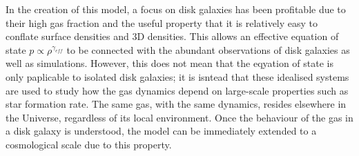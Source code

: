 In the creation of this model, a focus on disk galaxies has been profitable due to their high gas fraction and the useful property that it is relatively easy \citep{schaye2004} to conflate surface densities and 3D densities.
This allows an effective equation of state $p \propto \rho^{\gamma_{eff}}$ to be connected with the abundant observations of disk galaxies as well as simulations.
However, this does not mean that the eqyation of state is only paplicable to isolated disk galaxies; it is isntead that these idealised systems are used to study how the gas dynamics depend on large-scale properties such as star formation rate.
The same gas, with the same dynamics, resides elsewhere in the Universe, regardless of its local environment.
Once the behaviour of the gas in a disk galaxy is understood, the model can be immediately extended to a cosmological scale due to this property.
